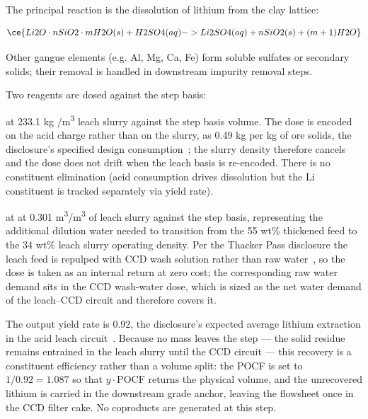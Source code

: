 \documentclass{article}
\renewcommand\_{\textunderscore\allowbreak}
\newcommand{\alteq}[1]{}
\newcommand{\alteqend}{}
\begin{document}
The principal reaction is the dissolution of lithium from the clay lattice:
\vspace{-1em}
\alteq{Lithium oxide combined with silicon dioxide and water in solid form reacts with aqueous sulfuric acid to produce aqueous lithium sulfate, solid silicon dioxide, and water.}
\begin{equation}
\ce{Li2O \cdot nSiO2 \cdot mH2O (s) + H2SO4 (aq) -> Li2SO4 (aq) + nSiO2 (s) + (m+1)H2O}
\end{equation}
\alteqend

Other gangue elements (e.g. Al, Mg, Ca, Fe) form soluble sulfates or secondary solids; their removal is handled in downstream impurity removal steps.  

Two reagents are dosed against the step basis:
\begin{description}[noitemsep, topsep=0pt]
\item[\textbullet\enskip Sulfuric acid] at 233.1 kg /\si{m^3} leach slurry against the step basis volume. The dose is encoded on the acid charge rather than on the slurry, as 0.49 kg  per kg of ore solids, the disclosure's specified design consumption~\cite{sgscanadaincSK1300Technical2024, rothFeasibilityStudyNational2022}; the slurry density therefore cancels and the dose does not drift when the leach basis is re-encoded. There is no constituent elimination (acid consumption drives dissolution but the Li constituent is tracked separately via yield rate).
\item[\textbullet\enskip Recycled process water] at at 0.301 \si{m^3/m^3} of leach slurry against the step basis, representing the additional dilution water needed to transition from the 55 wt\% thickened feed to the 34 wt\% leach slurry operating density. Per the Thacker Pass disclosure the leach feed is repulped with CCD wash solution rather than raw water~\cite{sgscanadaincSK1300Technical2024}, so the dose is taken as an internal return at zero cost; the corresponding raw water demand sits in the CCD wash-water dose, which is sized as the net water demand of the leach--CCD circuit and therefore covers it.
\end{description}

The output yield rate is 0.92, the disclosure's expected average lithium extraction in the acid leach circuit~\cite{sgscanadaincSK1300Technical2024}. Because no mass leaves the step --- the solid residue remains entrained in the leach slurry until the CCD circuit --- this recovery is a constituent efficiency rather than a volume split: the POCF is set to $1/0.92=1.087$ so that $y \cdot \text{POCF}$ returns the physical volume, and the unrecovered lithium is carried in the downstream grade anchor, leaving the flowsheet once in the CCD filter cake. No coproducts are generated at this step.
\end{document}

